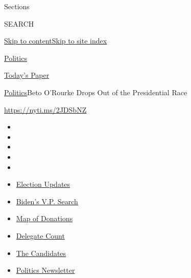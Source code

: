 Sections

SEARCH

\protect\hyperlink{site-content}{Skip to
content}\protect\hyperlink{site-index}{Skip to site index}

\href{https://www.nytimes.com/section/politics}{Politics}

\href{https://myaccount.nytimes.com/auth/login?response_type=cookie\&client_id=vi}{}

\href{https://www.nytimes.com/section/todayspaper}{Today's Paper}

\href{/section/politics}{Politics}\textbar{}Beto O'Rourke Drops Out of
the Presidential Race

\url{https://nyti.ms/2JDSbNZ}

\begin{itemize}
\item
\item
\item
\item
\item
\end{itemize}

\begin{itemize}
\item
  \href{https://www.nytimes.com/2020/07/31/us/elections/biden-vs-trump.html?action=click\&pgtype=Article\&state=default\&region=TOP_BANNER\&context=storylines_menu}{Election
  Updates}
\item
  \href{https://www.nytimes.com/article/biden-vice-president-2020.html?action=click\&pgtype=Article\&state=default\&region=TOP_BANNER\&context=storylines_menu}{Biden's
  V.P. Search}
\item
  \href{https://www.nytimes.com/interactive/2020/07/24/us/politics/trump-biden-campaign-donors.html?action=click\&pgtype=Article\&state=default\&region=TOP_BANNER\&context=storylines_menu}{Map
  of Donations}
\item
  \href{https://www.nytimes.com/interactive/2020/us/elections/delegate-count-primary-results.html?action=click\&pgtype=Article\&state=default\&region=TOP_BANNER\&context=storylines_menu}{Delegate
  Count}
\item
  \href{https://www.nytimes.com/interactive/2019/us/politics/2020-presidential-candidates.html?action=click\&pgtype=Article\&state=default\&region=TOP_BANNER\&context=storylines_menu}{The
  Candidates}
\item
  \href{https://www.nytimes.com/newsletters/politics?action=click\&pgtype=Article\&state=default\&region=TOP_BANNER\&context=storylines_menu}{Politics
  Newsletter}
\end{itemize}


